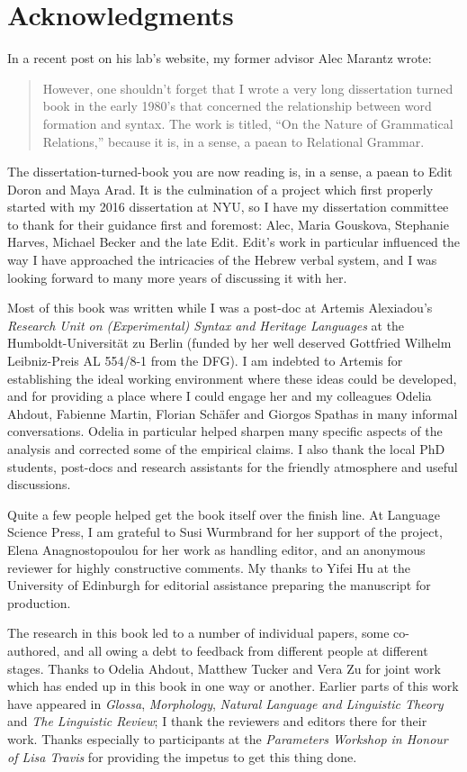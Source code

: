 \chapter*{Acknowledgments}

In a recent post on his lab's website, my former advisor Alec Marantz wrote:
\begin{quote}
	However, one shouldn't forget that I wrote a very long dissertation turned book in the early 1980's that concerned the relationship between word formation and syntax. The work is titled, ``On the Nature of Grammatical Relations,'' because it is, in a sense, a paean to Relational Grammar.
\end{quote}
The dissertation-turned-book you are now reading is, in a sense, a paean to Edit Doron and Maya Arad. It is the culmination of a project which first properly started with my 2016 dissertation at NYU, so I have my dissertation committee to thank for their guidance first and foremost: Alec, Maria Gouskova, Stephanie Harves, Michael Becker and the late Edit. Edit's work in particular influenced the way I have approached the intricacies of the Hebrew verbal system, and I was looking forward to many more years of discussing it with her.

Most of this book was written while I was a post-doc at Artemis Alexiadou's \emph{Research Unit on (Experimental) Syntax and Heritage Languages} at the Humboldt-Universit\"at zu Berlin (funded by her well deserved Gottfried Wilhelm Leibniz-Preis AL 554/8-1 from the DFG). I am indebted to Artemis for establishing the ideal working environment where these ideas could be developed, and for providing a place where I could engage her and my colleagues Odelia Ahdout, Fabienne Martin, Florian Sch\"afer and Giorgos Spathas in many informal conversations. Odelia in particular helped sharpen many specific aspects of the analysis and corrected some of the empirical claims. I also thank the local PhD students, post-docs and research assistants for the friendly atmosphere and useful discussions.

Quite a few people helped get the book itself over the finish line. At Language Science Press, I am grateful to Susi Wurmbrand for her support of the project, Elena Anagnostopoulou for her work as handling editor, and an anonymous reviewer for highly constructive comments. My thanks to Yifei Hu at the University of Edinburgh for editorial assistance preparing the manuscript for production.

The research in this book led to a number of individual papers, some co-authored, and all owing a debt to feedback from different people at different stages. Thanks to Odelia Ahdout, Matthew Tucker and Vera Zu for joint work which has ended up in this book in one way or another. Earlier parts of this work have appeared in \emph{Glossa}, \emph{Morphology}, \emph{Natural Language and Linguistic Theory} and \emph{The Linguistic Review}; I thank the reviewers and editors there for their work. Thanks especially to participants at the \emph{Parameters Workshop in Honour of Lisa Travis} for providing the impetus to get this thing done.

